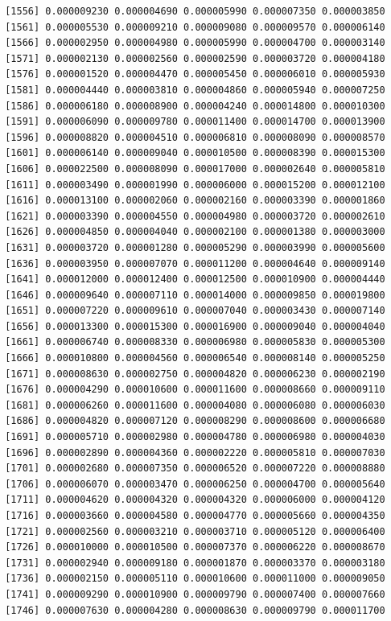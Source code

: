 \documentclass[]{article}
\begin{document}
\begin{verbatim}
 [1556] 0.000009230 0.000004690 0.000005990 0.000007350 0.000003850
 [1561] 0.000005530 0.000009210 0.000009080 0.000009570 0.000006140
 [1566] 0.000002950 0.000004980 0.000005990 0.000004700 0.000003140
 [1571] 0.000002130 0.000002560 0.000002590 0.000003720 0.000004180
 [1576] 0.000001520 0.000004470 0.000005450 0.000006010 0.000005930
 [1581] 0.000004440 0.000003810 0.000004860 0.000005940 0.000007250
 [1586] 0.000006180 0.000008900 0.000004240 0.000014800 0.000010300
 [1591] 0.000006090 0.000009780 0.000011400 0.000014700 0.000013900
 [1596] 0.000008820 0.000004510 0.000006810 0.000008090 0.000008570
 [1601] 0.000006140 0.000009040 0.000010500 0.000008390 0.000015300
 [1606] 0.000022500 0.000008090 0.000017000 0.000002640 0.000005810
 [1611] 0.000003490 0.000001990 0.000006000 0.000015200 0.000012100
 [1616] 0.000013100 0.000002060 0.000002160 0.000003390 0.000001860
 [1621] 0.000003390 0.000004550 0.000004980 0.000003720 0.000002610
 [1626] 0.000004850 0.000004040 0.000002100 0.000001380 0.000003000
 [1631] 0.000003720 0.000001280 0.000005290 0.000003990 0.000005600
 [1636] 0.000003950 0.000007070 0.000011200 0.000004640 0.000009140
 [1641] 0.000012000 0.000012400 0.000012500 0.000010900 0.000004440
 [1646] 0.000009640 0.000007110 0.000014000 0.000009850 0.000019800
 [1651] 0.000007220 0.000009610 0.000007040 0.000003430 0.000007140
 [1656] 0.000013300 0.000015300 0.000016900 0.000009040 0.000004040
 [1661] 0.000006740 0.000008330 0.000006980 0.000005830 0.000005300
 [1666] 0.000010800 0.000004560 0.000006540 0.000008140 0.000005250
 [1671] 0.000008630 0.000002750 0.000004820 0.000006230 0.000002190
 [1676] 0.000004290 0.000010600 0.000011600 0.000008660 0.000009110
 [1681] 0.000006260 0.000011600 0.000004080 0.000006080 0.000006030
 [1686] 0.000004820 0.000007120 0.000008290 0.000008600 0.000006680
 [1691] 0.000005710 0.000002980 0.000004780 0.000006980 0.000004030
 [1696] 0.000002890 0.000004360 0.000002220 0.000005810 0.000007030
 [1701] 0.000002680 0.000007350 0.000006520 0.000007220 0.000008880
 [1706] 0.000006070 0.000003470 0.000006250 0.000004700 0.000005640
 [1711] 0.000004620 0.000004320 0.000004320 0.000006000 0.000004120
 [1716] 0.000003660 0.000004580 0.000004770 0.000005660 0.000004350
 [1721] 0.000002560 0.000003210 0.000003710 0.000005120 0.000006400
 [1726] 0.000010000 0.000010500 0.000007370 0.000006220 0.000008670
 [1731] 0.000002940 0.000009180 0.000001870 0.000003370 0.000003180
 [1736] 0.000002150 0.000005110 0.000010600 0.000011000 0.000009050
 [1741] 0.000009290 0.000010900 0.000009790 0.000007400 0.000007660
 [1746] 0.000007630 0.000004280 0.000008630 0.000009790 0.000011700

\end{verbatim}
\end{document}
